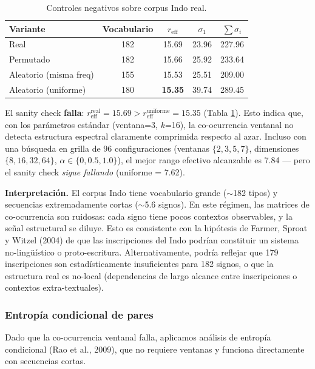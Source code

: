 \documentclass[11pt,a4paper]{article}
\newcommand{\1}{\mathbf{1}}
\numberwithin{equation}{section}
\begin{document}
\begin{table}[h]
\centering
\caption{Controles negativos sobre corpus Indo real.}
\label{tab:control_indus}
\begin{tabular}{lcccc}
\toprule
Variante & Vocabulario & $r_{\text{eff}}$ & $\sigma_1$ & $\sum \sigma_i$ \\
\midrule
Real & 182 & 15.69 & 23.96 & 227.96 \\
Permutado & 182 & 15.66 & 25.92 & 233.64 \\
Aleatorio (misma freq) & 155 & 15.53 & 25.51 & 209.00 \\
Aleatorio (uniforme) & 180 & \textbf{15.35} & 39.74 & 289.45 \\
\bottomrule
\end{tabular}
\end{table}

El sanity check \textbf{falla}: $r_{\text{eff}}^{\text{real}} = 15.69 > r_{\text{eff}}^{\text{uniforme}} = 15.35$ (Tabla \ref{tab:control_indus}). Esto indica que, con los parámetros estándar (ventana=3, $k$=16), la co-ocurrencia ventanal no detecta estructura espectral claramente comprimida respecto al azar. Incluso con una búsqueda en grilla de 96 configuraciones (ventanas $\{2,3,5,7\}$, dimensiones $\{8,16,32,64\}$, $\alpha \in \{0, 0.5, 1.0\}$), el mejor rango efectivo alcanzable es 7.84 --- pero el sanity check \emph{sigue fallando} (uniforme = 7.62).

\textbf{Interpretación.} El corpus Indo tiene vocabulario grande ($\sim$182 tipos) y secuencias extremadamente cortas ($\sim$5.6 signos). En este régimen, las matrices de co-ocurrencia son ruidosas: cada signo tiene pocos contextos observables, y la señal estructural se diluye. Esto es consistente con la hipótesis de Farmer, Sproat y Witzel (2004) de que las inscripciones del Indo podrían constituir un sistema no-lingüístico o proto-escritura. Alternativamente, podría reflejar que 179 inscripciones son estadísticamente insuficientes para 182 signos, o que la estructura real es no-local (dependencias de largo alcance entre inscripciones o contextos extra-textuales).

\subsubsection{Entropía condicional de pares}

Dado que la co-ocurrencia ventanal falla, aplicamos análisis de entropía condicional (Rao et al., 2009), que no requiere ventanas y funciona directamente con secuencias cortas.
\end{document}
